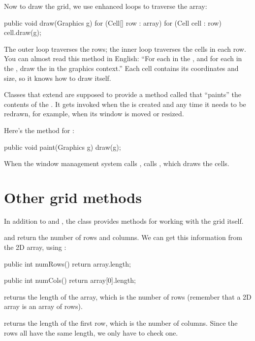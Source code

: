 Now to draw the grid, we use enhanced  loops to traverse the array:

\begin{code}
public void draw(Graphics g) {
    for (Cell[] row : array) {
        for (Cell cell : row) {
            cell.draw(g);
        }
    }
}
\end{code}

The outer loop traverses the rows; the inner loop traverses the cells in each row.
You can almost read this method in English: ``For each  in the , and for each  in the , draw the  in the graphics context.''
Each cell contains its coordinates and size, so it knows how to draw itself.

Classes that extend  are supposed to provide a method called  that ``paints'' the contents of the .
It gets invoked when the  is created and any time it needs to be redrawn, for example, when its window is moved or resized.

Here's the  method for :

\begin{code}
public void paint(Graphics g) {
    draw(g);
}
\end{code}

When the window management system calls ,  calls , which draws the cells.


\section{Other grid methods}

In addition to  and , the  class provides methods for working with the grid itself.

 and  return the number of rows and columns.
We can get this information from the 2D array, using :

\begin{code}
public int numRows() {
    return array.length;
}

public int numCols() {
    return array[0].length;
}
\end{code}

 returns the length of the array, which is the number of rows (remember that a 2D array is an array of rows).

 returns the length of the first row, which is the number of columns.
Since the rows all have the same length, we only have to check one.


